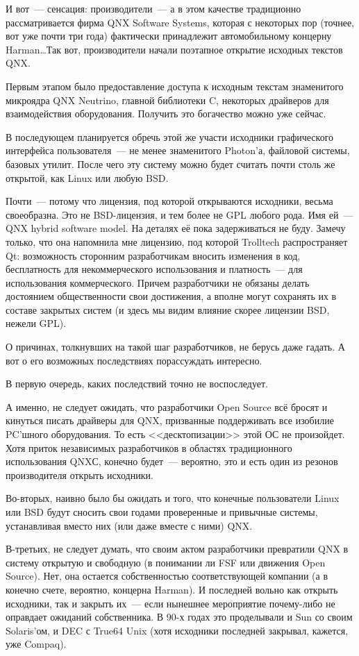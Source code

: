 И вот~--- сенсация: производители~--- а в этом качестве традиционно рассматривается фирма QNX Software Systems, которая с некоторых пор (точнее, вот уже почти три года) фактически принадлежит автомобильному концерну Harman\dots Так вот, производители начали поэтапное открытие исходных текстов QNX.

Первым этапом было предоставление доступа к исходным текстам знаменитого микроядра QNX Neutrino, главной библиотеки C, некоторых драйверов для взаимодействия оборудования. Получить это богачество можно уже сейчас.

В последующем планируется обречь этой же участи исходники графического интерфейса пользователя~--- не менее знаменитого Photon'а, файловой системы, базовых утилит. После чего эту систему можно будет считать почти столь же открытой, как Linux или любую BSD.

Почти~--- потому что лицензия, под которой открываются исходники, весьма своеобразна. Это не BSD-лицензия, и тем более не GPL любого рода. Имя ей~--- QNX hybrid software model. На деталях её пока задерживаться не буду. Замечу только, что она напомнила мне лицензию, под которой Trolltech распространяет Qt: возможность сторонним разработчикам вносить изменения в код, бесплатность для некоммерческого использования и платность~--- для использования коммерческого. Причем разработчики не обязаны делать достоянием общественности свои достижения, а вполне могут сохранять их в составе закрытых систем (и здесь мы видим влияние скорее лицензии BSD, нежели GPL).

О причинах, толкнувших на такой шаг разработчиков, не берусь даже гадать. А вот о его возможных последствиях порассуждать интересно.

В первую очередь, каких последствий точно не воспоследует.

А именно, не следует ожидать, что разработчики Open Source всё бросят и кинуться писать драйверы для QNX, призванные поддерживать все изобилие PC'шного оборудования. То есть <<десктопизации>> этой ОС не произойдет. Хотя приток независимых разработчиков в областях традиционного использования QNXС, конечно будет~--- вероятно, это и есть один из резонов производителя открыть исходники.

Во-вторых, наивно было бы ожидать и того, что конечные пользователи Linux или BSD будут сносить свои годами проверенные и привычные системы, устанавливая вместо них (или даже вместе с ними) QNX.

В-третьих, не следует думать, что своим актом разработчики превратили QNX в систему открытую и свободную (в понимании ли FSF или движения Open Source). Нет, она остается собственностью соответствующей компании (а в конечно счете, вероятно, концерна Harman). И последней вольно как открыть исходники, так и закрыть их~--- если нынешнее мероприятие почему-либо не оправдает ожиданий собственника. В 90-х годах это проделывали и Sun со своим Solaris'ом, и DEC с True64 Unix (хотя исходники последней закрывал, кажется, уже Compaq).


